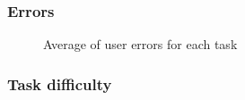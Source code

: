 \subsubsection{Errors}
    \begin{figure}[!ht]
        \begin{minipage}{\linewidth}
            \centering
            \captionsetup{justification=centering}
            \caption{Average of user errors for each task}
            \label{BarsErrors}
        \end{minipage}
    \end{figure}

\subsubsection{Task difficulty}



